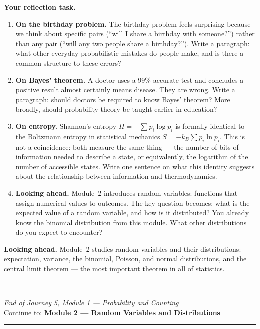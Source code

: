 \documentclass[12pt, a4paper]{article}
\newcounter{problem}
\begin{document}
\begin{reflectionbox}
\textbf{Your reflection task.}

\begin{enumerate}
  \item \textbf{On the birthday problem.} The birthday problem feels surprising because we think about specific pairs (``will I share a birthday with someone?'') rather than any pair (``will any two people share a birthday?''). Write a paragraph: what other everyday probabilistic mistakes do people make, and is there a common structure to these errors?

  \item \textbf{On Bayes' theorem.} A doctor uses a 99\%-accurate test and concludes a positive result almost certainly means disease. They are wrong. Write a paragraph: should doctors be required to know Bayes' theorem? More broadly, should probability theory be taught earlier in education?

  \item \textbf{On entropy.} Shannon's entropy $H=-\sum p_i\log p_i$ is formally identical to the Boltzmann entropy in statistical mechanics $S=-k_B\sum p_i\ln p_i$. This is not a coincidence: both measure the same thing --- the number of bits of information needed to describe a state, or equivalently, the logarithm of the number of accessible states. Write one sentence on what this identity suggests about the relationship between information and thermodynamics.

  \item \textbf{Looking ahead.} Module~2 introduces random variables: functions that assign numerical values to outcomes. The key question becomes: what is the expected value of a random variable, and how is it distributed? You already know the binomial distribution from this module. What other distributions do you expect to encounter?
\end{enumerate}
\end{reflectionbox}

\medskip
\noindent\textbf{Looking ahead.}
Module~2 studies random variables and their distributions: expectation, variance, the binomial, Poisson, and normal distributions, and the central limit theorem --- the most important theorem in all of statistics.

\vspace{1.4cm}
\begin{center}
{\color{MidBlue}\rule{0.5\linewidth}{0.8pt}}\\[6pt]
{\small\color{DarkGrey}\textit{End of Journey 5, Module 1 --- Probability and Counting}}\\[4pt]
{\small\color{DarkGrey}Continue to: \textbf{Module 2 --- Random Variables and Distributions}}\\[6pt]
{\color{MidBlue}\rule{0.5\linewidth}{0.8pt}}
\end{center}
\end{document}
